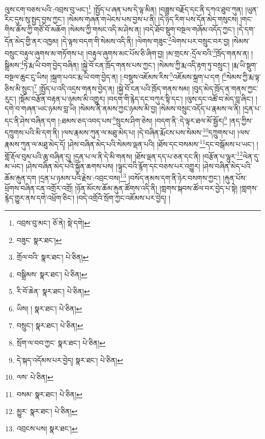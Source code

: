 ལུས་ངག་བཅས་པའི་:འབྲས་བུ་ཡང་།\footnote{འབྲས་བུ་མང་།  ཅོ་ནེ།  སྡེ་དགེ། } །སྤྱོད་པ་ཞན་པས་དེ་ལྟ་མིན། །བཟླས་བརྗོད་དང་ནི་དཀའ་ཐུབ་ཀུན། །ཡུན་རིང་དུས་སུ་སྤྱད་བྱས་ཀྱང་། །སེམས་གཞན་གཡེངས་པས་བྱས་པ་ནི། །དེ་ཉིད་རིག་པས་དོན་མེད་གསུངས། །གང་གིས་ཆོས་ཀྱི་གཙོ་བོ་མཆོག །སེམས་ཀྱི་གསང་འདི་མ་ཤེས་ན། །བདེ་ཐོབ་སྡུག་བསྔལ་གཞོམ་འདོད་ཀྱང་། །དེ་དག་དོན་མེད་གྱི་ནར་འཁྱམ། །དེ་ལྟས་བདག་གི་སེམས་འདི་ནི། །ལེགས་གཟུང་\footnote{བཟུང་  སྣར་ཐང་། }ལེགས་པར་བསྲུང་བར་བྱ། །སེམས་བསྲུང་བརྟུལ་ཞུགས་མ་གཏོགས་པ། །བརྟུལ་ཞུགས་མང་པོས་ཅི་ཞིག་བྱ། །མ་གྲངས་:དྲོལ་བའི་\footnote{གྲོལ་བའི་  སྣར་ཐང་།  པེ་ཅིན། }ཁྲོད་གནས་ན། །སྒྲིམས་\footnote{བསྒྲིམས་  སྣར་ཐང་།  པེ་ཅིན། }ཏེ་རྨ་ཡི་བག་བྱེད་བཞིན། །སྐྱེ་བོ་ངན་ཁྲོད་གནས་པས་ཀྱང་། །སེམས་ཀྱི་རྨ་འདི་རྟག་ཏུ་བསྲུང་། །རྨ་ཡི་སྡུག་བསྔལ་ཆུང་ངུ་ཡིས། །སྐྲག་པའང་རྨ་ཡི་བག་བྱེད་ན། །:བསྡུས་འཇོམས་རིས་\footnote{རི་བོ་ཆེན་  སྣར་ཐང་།  པེ་ཅིན། }འཇོམས་སྐྲག་པ་དག །\footnote{ཡིས། །  སྣར་ཐང་།  པེ་ཅིན། }སེམས་ཀྱི་རྨ་ལྟ་ཅིས་མི་སྲུང་།\footnote{བསྲུང་།  སྣར་ཐང་།  པེ་ཅིན། } །སྤྱོད་པ་འདི་འདྲས་གནས་བྱེད་ན། །སྐྱེ་བོ་ངན་པའི་ཁྲོད་གནས་སམ། །བུད་མེད་ཁྲོད་ན་གནས་ཀྱང་རུང་། །སྡོམ་བརྩོན་བརྟན་པ་ཉམས་མི་འགྱུར། །བདག་གི་རྙེད་དང་བཀུར་སྟི་དང་། །ལུས་དང་འཚོ་བ་མེད་བླ་ཞིང་། །དགེ་བ་གཞན་ཡང་ཉམས་བླ་ཡི། །སེམས་ནི་ནམས་ཀྱང་ཉམས་མི་བྱ། །སེམས་བསྲུང་འདོད་པ་རྣམས་ལ་ནི། །དྲན་པ་དང་ནི་ཤེས་བཞིན་དག །:ཐམས་ཅད་འབད་པས་\footnote{སྲོག་ལ་བབ་ཀྱང་  སྣར་ཐང་།  པེ་ཅིན། }སྲུངས་ཤིག་ཅེས། །བདག་ནི་:དེ་ལྟར་ཐལ་མོ་སྦྱོར།\footnote{དེ་སྐད་འདོམས་པར་བྱེད།  སྣར་ཐང་།  པེ་ཅིན། } །ནད་ཀྱིས་དཀྲུགས་པའི་མི་དག་ནི། །ལས་རྣམས་ཀུན་ལ་མཐུ་མེད་པ། །དེ་བཞིན་རྨོངས་པས་སེམས་\footnote{ལས་  པེ་ཅིན། }དཀྲུགས་པ། །ལས་རྣམས་ཀུན་ལ་མཐུ་མེད་དོ། །ཤེས་བཞིན་མེད་པའི་སེམས་ལྡན་པའི། །ཐོས་དང་བསམས་\footnote{བསམ་  སྣར་ཐང་།  པེ་ཅིན། }དང་བསྒོམས་པ་ཡང་། །གློ་རྡོལ་བུམ་པའི་ཆུ་བཞིན་དུ། །དྲན་པ་ལ་ནི་དེ་མི་གནས། །ཐོས་ལྡན་དད་པ་ཅན་དང་ནི། །བརྩོན་པ་ལྷུར་\footnote{མྱུར་  སྣར་ཐང་།  པེ་ཅིན། }ལེན་དུ་མ་ཡང་། །ཤེས་བཞིན་མེད་པའི་སྐྱོན་ཆགས་པས། །ལྟུང་བའི་རྙོག་དང་བཅས་པར་འགྱུར། །ཤེས་བཞིན་མེད་པའི་ཆོམ་རྐུན་དག །དྲན་པ་ཉམས་པའི་རྗེས་:འབྲང་བས།\footnote{འབྲངས་པས།  སྣར་ཐང་། } །བསོད་ནམས་དག་ནི་ཉེར་བསགས་ཀྱང་། །རྐུན་པོས་ཕྲོགས་བཞིན་ངན་འགྲོར་འགྲོ། །ཉོན་མོངས་ཆོམ་རྐུན་ཚོགས་འདི་ནི། །གླགས་སྐབས་ཚོལ་བར་བྱེད་པ་སྟེ། །གླགས་རྙེད་གྱུར་ནས་དགེ་འཕྲོག་ཅིང་། །བདེ་འགྲོའི་སྲོག་ཀྱང་འཇོམས་པར་བྱེད། །
